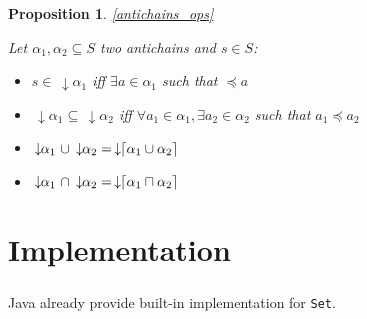 \documentclass[letterpaper]{memoir}
\DeclarePairedDelimiter{\ceil}{\lceil}{\rceil}
\newcommand{\darrow}{\, \downarrow \!\!}
\newtheorem{proposition}{Proposition}
\begin{document}
\begin{proposition}

\ref{antichains_ops}

Let $\alpha_1, \alpha_2 \subseteq S$ two antichains and $s \in S$:

\begin{itemize}
    \item $s \in \darrow \alpha_1$
    iff $\exists a \in \alpha_1$ such that $\preceq a$
    \item $\darrow \alpha_1 \subseteq \darrow \alpha_2$
    iff $\forall a_1 \in \alpha_1,
    \exists a_2 \in \alpha_2$ such that $a_1 \preceq a_2$
    \item $ \darrow \alpha_1 \ \cup \darrow \alpha_2 =
    \darrow \ceil{\alpha_1 \cup \alpha_2}$
    \item $\darrow \alpha_1 \ \cap \darrow \alpha_2 =
    \darrow \ceil{\alpha_1 \sqcap \alpha_2}$


\end{itemize}

\end{proposition}



%
%

\chapter{Implementation}

\paragraph{}

Java already provide built-in implementation for \texttt{Set}.

\paragraph{}
\end{document}
